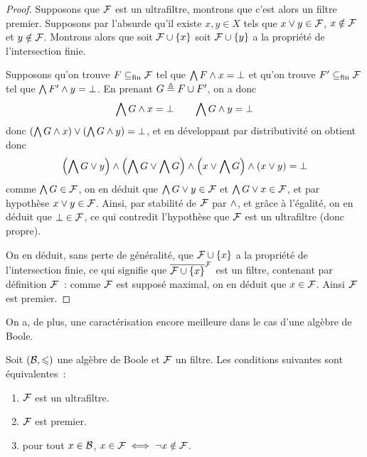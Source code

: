 \begin{proof}
  Supposons que $\mathcal{F}$ est un ultrafiltre, montrons que c'est alors un
  filtre premier. Supposons par l'absurde qu'il existe $x,y\in X$ tels que
  $x\vee y \in \mathcal{F}$, $x\notin\mathcal{F}$ et $y\notin\mathcal{F}$.
  Montrons alors que soit $\mathcal{F}\cup\{x\}$ soit $\mathcal{F}\cup\{y\}$ a la
  propriété de l'intersection finie.

  Supposons qu'on trouve $F\subseteq_{\mathrm{fin}} \mathcal{F}$ tel que
  $\bigwedge F \wedge x =\bot$ et qu'on trouve $F'\subseteq_{\mathrm{fin}}\mathcal{F}$ tel que
  $\bigwedge F' \wedge y = \bot$. En prenant $G \triangleq F \cup F'$, on a donc
  \[\bigwedge G \land x = \bot \qquad \bigwedge G \wedge y = \bot\]
  donc $\left(\bigwedge G \wedge x\right)\vee\left(\bigwedge G\wedge y\right) = \bot$,
  et en développant par distributivité on obtient donc
  \[\left(\bigwedge G \vee y\right)\wedge\left(\bigwedge G\vee \bigwedge G\right)
  \wedge \left(x\vee \bigwedge G\right)\wedge(x\vee y) = \bot\]
  comme $\bigwedge G\in \mathcal{F}$, on en déduit que
  $\bigwedge G \vee y \in \mathcal{F}$ et $\bigwedge G \vee x \in \mathcal{F}$,
  et par hypothèse $x\vee y \in \mathcal{F}$. Ainsi, par stabilité de
  $\mathcal{F}$ par $\wedge$, et grâce à l'égalité, on en déduit que
  $\bot\in\mathcal{F}$, ce qui contredit l'hypothèse que $\mathcal{F}$ est un
  ultrafiltre (donc propre).

  On en déduit, sans perte de généralité, que $\mathcal{F}\cup\{x\}$ a la
  propriété de l'intersection finie, ce qui signifie que
  $\overline{\mathcal{F}\cup\{x\}}^{\mathcal{F}}$ est un filtre, contenant par définition
  $\mathcal{F}$~: comme $\mathcal{F}$ est supposé maximal, on en déduit que
  $x\in \mathcal{F}$. Ainsi $\mathcal{F}$ est premier.
\end{proof}

\noindent
On a, de plus, une caractérisation encore meilleure dans le cas d'une algèbre de
Boole.

\begin{proposition}
  Soit $(\mathcal{B},\leqslant)$ une algèbre de Boole et $\mathcal{F}$ un filtre. Les
  conditions suivantes sont équivalentes~:
  \begin{enumerate}[label=(\roman*)]
  \item \label{enum.ultra.prim1} $\mathcal{F}$ est un ultrafiltre.
  \item \label{enum.ultra.prim2} $\mathcal{F}$ est premier.
  \item \label{enum.ultra.prim3} pour tout $x\in \mathcal{B}$,
    $x\in \mathcal{F} \iff \lnot x \notin\mathcal{F}$.
  \end{enumerate}
\end{proposition}

